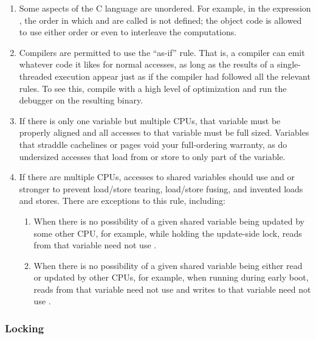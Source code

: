 \begin{enumerate}
\item	Some aspects of the C language are unordered.
	For example, in the expression , the order in
	which  and  are called is not defined; the object
	code is allowed to use either order or even to interleave the
	computations.

\item	Compilers are permitted to use the ``as-if'' rule.
	That is, a compiler can emit whatever code it likes for normal accesses,
	as long as the results of a single-threaded execution appear
	just as if the compiler had followed all the relevant rules.
	To see this, compile with a high level of optimization and run
	the debugger on the resulting binary.

\item	If there is only one variable but multiple CPUs, that variable
	must be properly aligned and all accesses to that variable must
	be full sized.
	Variables that straddle cachelines or pages void your full-ordering
	warranty, as do undersized accesses that load from or store to only
	part of the variable.

\item	If there are multiple CPUs, accesses to shared variables should
	use  and  or stronger to prevent
	load/store tearing, load/store fusing, and invented loads and stores.
	There are exceptions to this rule, including:

	\begin{enumerate}
	\item	When there is no possibility of a given shared variable
		being updated by some other CPU, for example, while
		holding the update-side lock, reads from that variable
		need not use .

	\item	When there is no possibility of a given shared variable
		being either read or updated by other CPUs, for example,
		when running during early boot, reads from that variable
		need not use  and writes to that variable
		need not use .
	\end{enumerate}
\end{enumerate}


\subsubsection{Locking}
\label{sec:docs:recipes:Locking}

